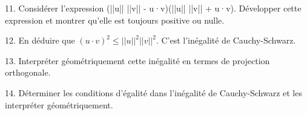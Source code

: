 \documentclass[10pt,a4paper]{article}
\begin{document}
11. Considérer l'expression (||u|| ||v|| - u·v)(||u|| ||v|| + u·v). Développer cette expression et montrer qu'elle est toujours positive ou nulle.

12. En déduire que $(u \cdot v)^2 \leq ||u||^2 ||v||^2$. C'est l'inégalité de Cauchy-Schwarz.

13. Interpréter géométriquement cette inégalité en termes de projection orthogonale.

14. Déterminer les conditions d'égalité dans l'inégalité de Cauchy-Schwarz et les interpréter géométriquement.
\end{document}
